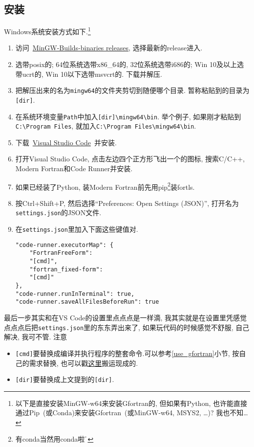 \subsection{安装}

Windows系统安装方式如下.\footnote{
    以下是直接安装MinGW-w64来安装Gfortran的, 但如果有Python, 也许能直接通过Pip~(或Conda)来安装Gfortran~(或MinGW-w64, MSYS2, \dots)? 我也不知\dots
}
\begin{enumerate}
    \item 访问~\href{https://github.com/niXman/mingw-builds-binaries/releases}
    {MinGW-Builds-binaries releases}, 选择最新的release进入.
    \item 选带posix的; 64位系统选带x86\_64的, 32位系统选带i686的; Win 10及以上选带ucrt的, Win 10以下选带msvcrt的. 下载并解压.
    \item 把解压出来的名为\verb|mingw64|的文件夹剪切到随便哪个目录. 暂称粘贴到的目录为\verb|[dir]|.
    \item 在系统环境变量\verb|Path|中加入\verb|[dir]\mingw64\bin|. 举个例子, 如果刚才粘贴到\verb|C:\Program Files|, 就加入\verb|C:\Program Files\mingw64\bin|.
    \item 下载~\href{https://code.visualstudio.com/sha/download?build=stable&os=win32-x64-user}
    {Visual Studio Code}~并安装.
    \item 打开Visual Studio Code, 点击左边四个正方形飞出一个的图标, 搜索C/C++, Modern Fortran和Code Runner并安装.
    \item[] 如果已经装了Python, 装Modern Fortran前先用pip\footnote{有conda当然用conda啦$\!\text{\~{}}$}装fortls.
    \item 按Ctrl+Shift+P, 然后选择``Preferences: Open Settings (JSON)'', 打开名为\verb|settings.json|的JSON文件.
    \item 在\verb|settings.json|里加入下面这些键值对.
    \begin{verbatim}
"code-runner.executorMap": {
    "FortranFreeForm":
    "[cmd]",
    "fortran_fixed-form":
    "[cmd]"
},
"code-runner.runInTerminal": true,
"code-runner.saveAllFilesBeforeRun": true
    \end{verbatim}
\end{enumerate}

最后一步其实和在VS Code的设置里点点点是一样滴, 我其实就是在设置里凭感觉点点点后把\verb|settings.json|里的东东弄出来了, 如果玩代码的时候感觉不舒服, 自己解决, 我可不管. 注意
\begin{itemize}
    \item \verb|[cmd]|要替换成编译并执行程序的整套命令.可以参考\ref{use_gfortran}小节, 按自己的需求替换, 也可以戳\href{https://zhuanlan.zhihu.com/p/362328064}{这里}搬运现成的.
    \item \verb|[dir]|要替换成上文提到的\verb|[dir]|.
\end{itemize}

